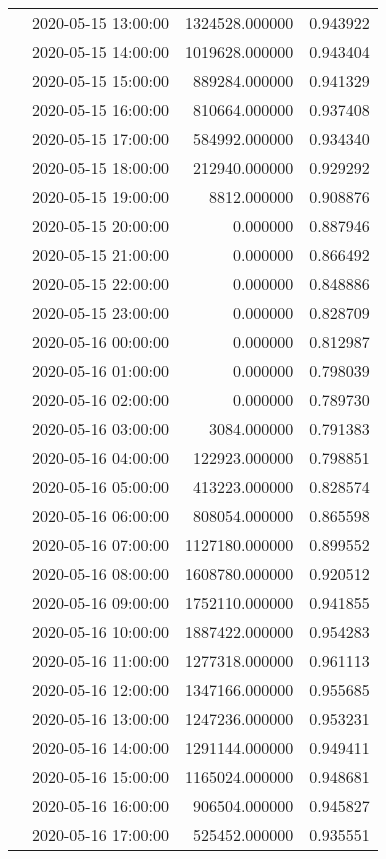 \begin{tabular}{llrr}
 & 2020-05-15 13:00:00 & 1324528.000000 & 0.943922 \\
 & 2020-05-15 14:00:00 & 1019628.000000 & 0.943404 \\
 & 2020-05-15 15:00:00 & 889284.000000 & 0.941329 \\
 & 2020-05-15 16:00:00 & 810664.000000 & 0.937408 \\
 & 2020-05-15 17:00:00 & 584992.000000 & 0.934340 \\
 & 2020-05-15 18:00:00 & 212940.000000 & 0.929292 \\
 & 2020-05-15 19:00:00 & 8812.000000 & 0.908876 \\
 & 2020-05-15 20:00:00 & 0.000000 & 0.887946 \\
 & 2020-05-15 21:00:00 & 0.000000 & 0.866492 \\
 & 2020-05-15 22:00:00 & 0.000000 & 0.848886 \\
 & 2020-05-15 23:00:00 & 0.000000 & 0.828709 \\
 & 2020-05-16 00:00:00 & 0.000000 & 0.812987 \\
 & 2020-05-16 01:00:00 & 0.000000 & 0.798039 \\
 & 2020-05-16 02:00:00 & 0.000000 & 0.789730 \\
 & 2020-05-16 03:00:00 & 3084.000000 & 0.791383 \\
 & 2020-05-16 04:00:00 & 122923.000000 & 0.798851 \\
 & 2020-05-16 05:00:00 & 413223.000000 & 0.828574 \\
 & 2020-05-16 06:00:00 & 808054.000000 & 0.865598 \\
 & 2020-05-16 07:00:00 & 1127180.000000 & 0.899552 \\
 & 2020-05-16 08:00:00 & 1608780.000000 & 0.920512 \\
 & 2020-05-16 09:00:00 & 1752110.000000 & 0.941855 \\
 & 2020-05-16 10:00:00 & 1887422.000000 & 0.954283 \\
 & 2020-05-16 11:00:00 & 1277318.000000 & 0.961113 \\
 & 2020-05-16 12:00:00 & 1347166.000000 & 0.955685 \\
 & 2020-05-16 13:00:00 & 1247236.000000 & 0.953231 \\
 & 2020-05-16 14:00:00 & 1291144.000000 & 0.949411 \\
 & 2020-05-16 15:00:00 & 1165024.000000 & 0.948681 \\
 & 2020-05-16 16:00:00 & 906504.000000 & 0.945827 \\
 & 2020-05-16 17:00:00 & 525452.000000 & 0.935551 \\

\end{tabular}
